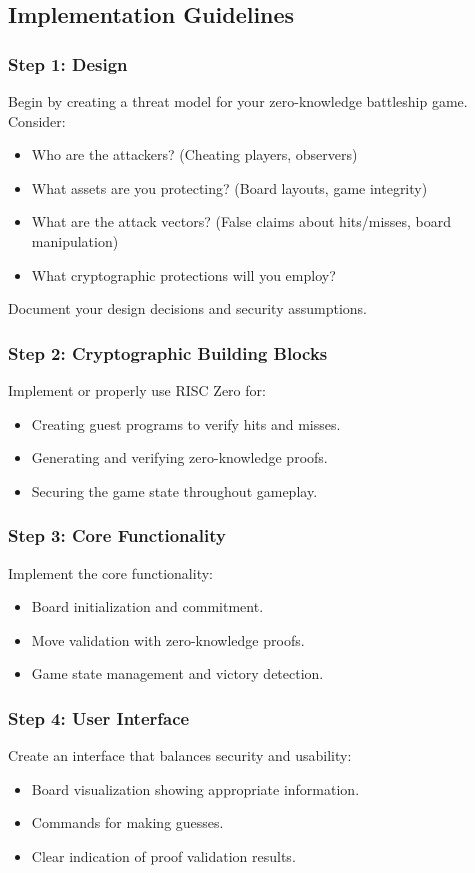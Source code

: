 \documentclass[10pt,a4paper,american]{exam}
\begin{document}
\subsection*{Implementation Guidelines}

\subsubsection*{Step 1: Design}
Begin by creating a threat model for your zero-knowledge battleship game. Consider:
\begin{itemize}
	\item Who are the attackers? (Cheating players, observers)
	\item What assets are you protecting? (Board layouts, game integrity)
	\item What are the attack vectors? (False claims about hits/misses, board manipulation)
	\item What cryptographic protections will you employ?
\end{itemize}

Document your design decisions and security assumptions.

\subsubsection*{Step 2: Cryptographic Building Blocks}
Implement or properly use RISC Zero for:
\begin{itemize}
	\item Creating guest programs to verify hits and misses.
	\item Generating and verifying zero-knowledge proofs.
	\item Securing the game state throughout gameplay.
\end{itemize}

\subsubsection*{Step 3: Core Functionality}
Implement the core functionality:
\begin{itemize}
	\item Board initialization and commitment.
	\item Move validation with zero-knowledge proofs.
	\item Game state management and victory detection.
\end{itemize}

\subsubsection*{Step 4: User Interface}
Create an interface that balances security and usability:
\begin{itemize}
	\item Board visualization showing appropriate information.
	\item Commands for making guesses.
	\item Clear indication of proof validation results.
\end{itemize}
\end{document}
